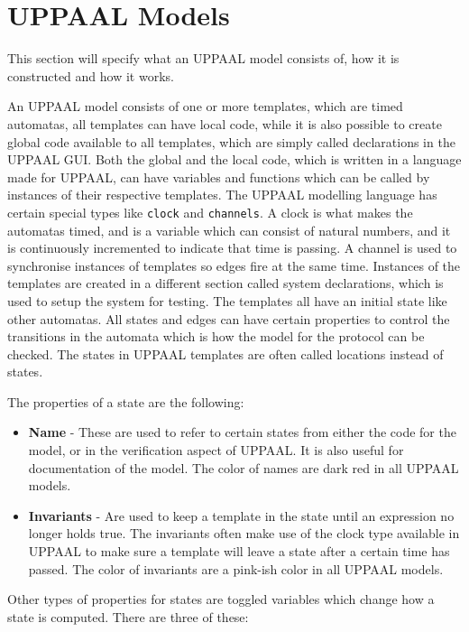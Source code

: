 \section{UPPAAL Models}
This section will specify what an UPPAAL model consists of, how it is constructed and how it works.

An UPPAAL model consists of one or more templates, which are timed automatas, all templates can have local code, while it is also possible to create global code available to all templates, which are simply called declarations in the UPPAAL GUI.
Both the global and the local code, which is written in a language made for UPPAAL, can have variables and functions which can be called by instances of their respective templates.
The UPPAAL modelling language has certain special types like \texttt{clock} and \texttt{channels}.
A clock is what makes the automatas timed, and is a variable which can consist of natural numbers, and it is continuously incremented to indicate that time is passing.
A channel is used to synchronise instances of templates so edges fire at the same time.
Instances of the templates are created in a different section called system declarations, which is used to setup the system for testing.
The templates all have an initial state like other automatas.
All states and edges can have certain properties to control the transitions in the automata which is how the model for the protocol can be checked.
The states in UPPAAL templates are often called locations instead of states.

The properties of a state are the following: 

\begin{itemize}
	\item \textbf{Name} - These are used to refer to certain states from either the code for the model, or in the verification aspect of UPPAAL. It is also useful for documentation of the model. The color of names are dark red in all UPPAAL models.
	\item \textbf{Invariants} - Are used to keep a template in the state until an expression no longer holds true. The invariants often make use of the clock type available in UPPAAL to make sure a template will leave a state after a certain time has passed. The color of invariants are a pink-ish color in all UPPAAL models.
\end{itemize}

Other types of properties for states are toggled variables which change how a state is computed.
There are three of these:

